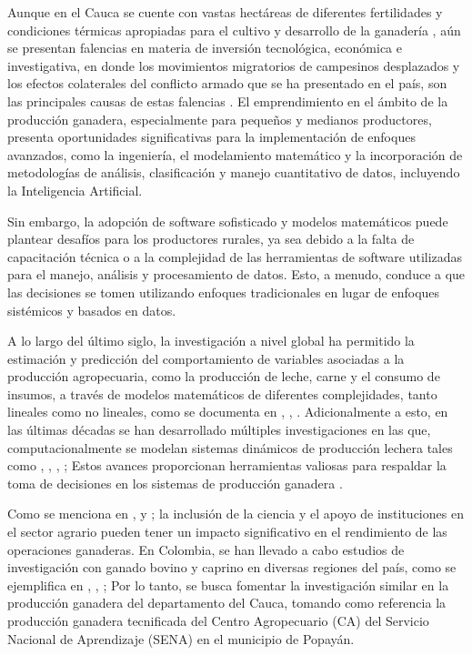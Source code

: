 Aunque en el Cauca se cuente con vastas hectáreas de diferentes fertilidades y condiciones térmicas apropiadas para el cultivo y desarrollo de la ganadería \cite{igac}, aún se presentan falencias en materia de inversión tecnológica, económica e investigativa, en donde los movimientos migratorios de campesinos desplazados y los efectos colaterales del conflicto armado que se ha presentado en el país, son las principales causas de estas falencias \cite{fao}. El emprendimiento en el ámbito de la producción ganadera, especialmente para pequeños y medianos productores, presenta oportunidades significativas para la implementación de enfoques avanzados, como la ingeniería, el modelamiento matemático y la incorporación de metodologías de análisis, clasificación y manejo cuantitativo de datos, incluyendo la Inteligencia Artificial.

Sin embargo, la adopción de software sofisticado y modelos matemáticos puede plantear desafíos para los productores rurales, ya sea debido a la falta de capacitación técnica o a la complejidad de las herramientas de software utilizadas para el manejo, análisis y procesamiento de datos. Esto, a menudo, conduce a que las decisiones se tomen utilizando enfoques tradicionales en lugar de enfoques sistémicos y basados en datos.

A lo largo del último siglo, la investigación a nivel global ha permitido la estimación y predicción del comportamiento de variables asociadas a la producción agropecuaria, como la producción de leche, carne y el consumo de insumos, a través de modelos matemáticos de diferentes complejidades, tanto lineales como no lineales, como se documenta en \cite{lechepaisa1}, \cite{caprinos}, \cite{colombiaherd}. Adicionalmente a esto, en las últimas décadas se han desarrollado múltiples investigaciones en las que, computacionalmente se modelan sistemas dinámicos de producción lechera tales como \cite{janaina1}, \cite{janaina2}, \cite{hdmwallace}, \cite{avila1}; Estos avances proporcionan herramientas valiosas para respaldar la toma de decisiones en los sistemas de producción ganadera \cite{gavira}.

Como se menciona en \cite{minagricultura}, \cite{ashby} y \cite{fao}; la inclusión de la ciencia y el apoyo de instituciones en el sector agrario pueden tener un impacto significativo en el rendimiento de las operaciones ganaderas. En Colombia, se han llevado a cabo estudios de investigación con ganado bovino y caprino en diversas regiones del país, como se ejemplifica en \cite{lechepaisa1}, \cite{lechepaisa2}, \cite{lechepastusa}; Por lo tanto, se busca fomentar la investigación similar en la producción ganadera del departamento del Cauca, tomando como referencia la producción ganadera tecnificada del Centro Agropecuario (CA) del Servicio Nacional de Aprendizaje (SENA) en el municipio de Popayán.

